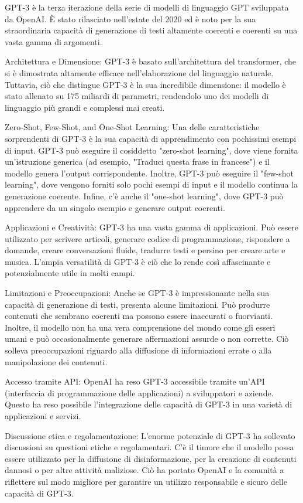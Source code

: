 GPT-3 è la terza iterazione della serie di modelli di linguaggio GPT sviluppata da OpenAI. È stato rilasciato nell'estate del 2020 ed è noto per la sua straordinaria capacità di generazione di testi altamente coerenti e coerenti su una vasta gamma di argomenti.

Architettura e Dimensione:
GPT-3 è basato sull'architettura del transformer, che si è dimostrata altamente efficace nell'elaborazione del linguaggio naturale. Tuttavia, ciò che distingue GPT-3 è la sua incredibile dimensione: il modello è stato allenato su 175 miliardi di parametri, rendendolo uno dei modelli di linguaggio più grandi e complessi mai creati.

Zero-Shot, Few-Shot, and One-Shot Learning:
Una delle caratteristiche sorprendenti di GPT-3 è la sua capacità di apprendimento con pochissimi esempi di input. GPT-3 può eseguire il cosiddetto "zero-shot learning", dove viene fornita un'istruzione generica (ad esempio, "Traduci questa frase in francese") e il modello genera l'output corrispondente. Inoltre, GPT-3 può eseguire il "few-shot learning", dove vengono forniti solo pochi esempi di input e il modello continua la generazione coerente. Infine, c'è anche il "one-shot learning", dove GPT-3 può apprendere da un singolo esempio e generare output coerenti.

Applicazioni e Creatività:
GPT-3 ha una vasta gamma di applicazioni. Può essere utilizzato per scrivere articoli, generare codice di programmazione, rispondere a domande, creare conversazioni fluide, tradurre testi e persino per creare arte e musica. L'ampia versatilità di GPT-3 è ciò che lo rende così affascinante e potenzialmente utile in molti campi.

Limitazioni e Preoccupazioni:
Anche se GPT-3 è impressionante nella sua capacità di generazione di testi, presenta alcune limitazioni. Può produrre contenuti che sembrano coerenti ma possono essere inaccurati o fuorvianti. Inoltre, il modello non ha una vera comprensione del mondo come gli esseri umani e può occasionalmente generare affermazioni assurde o non corrette. Ciò solleva preoccupazioni riguardo alla diffusione di informazioni errate o alla manipolazione dei contenuti.

Accesso tramite API:
OpenAI ha reso GPT-3 accessibile tramite un'API (interfaccia di programmazione delle applicazioni) a sviluppatori e aziende. Questo ha reso possibile l'integrazione delle capacità di GPT-3 in una varietà di applicazioni e servizi.

Discussione etica e regolamentazione:
L'enorme potenziale di GPT-3 ha sollevato discussioni su questioni etiche e regolamentari. C'è il timore che il modello possa essere utilizzato per la diffusione di disinformazione, per la creazione di contenuti dannosi o per altre attività maliziose. Ciò ha portato OpenAI e la comunità a riflettere sul modo migliore per garantire un utilizzo responsabile e sicuro delle capacità di GPT-3.

